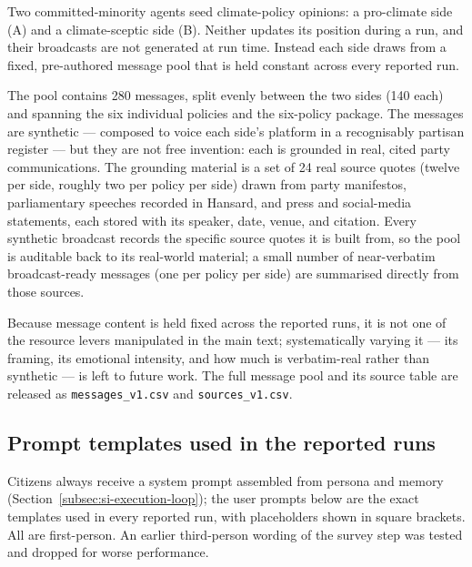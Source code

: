 \documentclass[pdflatex,sn-mathphys-num]{sn-jnl}%
\theoremstyle{thmstyleone}%
\theoremstyle{thmstyletwo}%
\theoremstyle{thmstylethree}%
\begin{document}
Two committed-minority agents seed climate-policy opinions: a pro-climate side (A)
and a climate-sceptic side (B). Neither updates its position during a run, and
their broadcasts are not generated at run time. Instead each side draws from a
fixed, pre-authored message pool that is held constant across every reported run.

The pool contains 280 messages, split evenly between the two sides (140 each) and
spanning the six individual policies and the six-policy package. The messages are
synthetic --- composed to voice each side's platform in a recognisably partisan
register --- but they are not free invention: each is grounded in real, cited party
communications. The grounding material is a set of 24 real source quotes (twelve
per side, roughly two per policy per side) drawn from party manifestos,
parliamentary speeches recorded in Hansard, and press and social-media statements,
each stored with its speaker, date, venue, and citation. Every synthetic broadcast
records the specific source quotes it is built from, so the pool is auditable back
to its real-world material; a small number of near-verbatim broadcast-ready
messages (one per policy per side) are summarised directly from those sources.

Because message content is held fixed across the reported runs, it is not one of
the resource levers manipulated in the main text; systematically varying it --- its
framing, its emotional intensity, and how much is verbatim-real rather than
synthetic --- is left to future work. The full message pool and its source table
are released as \texttt{messages\_v1.csv} and \texttt{sources\_v1.csv}.

\subsection{Prompt templates used in the reported runs}\label{subsec:si-prompt-stack}

Citizens always receive a system prompt assembled from persona and memory
(Section~\ref{subsec:si-execution-loop}); the user prompts below are the exact
templates used in every reported run, with placeholders shown in square brackets.
All are first-person. An earlier third-person wording of the survey step was tested
and dropped for worse performance.
\end{document}
